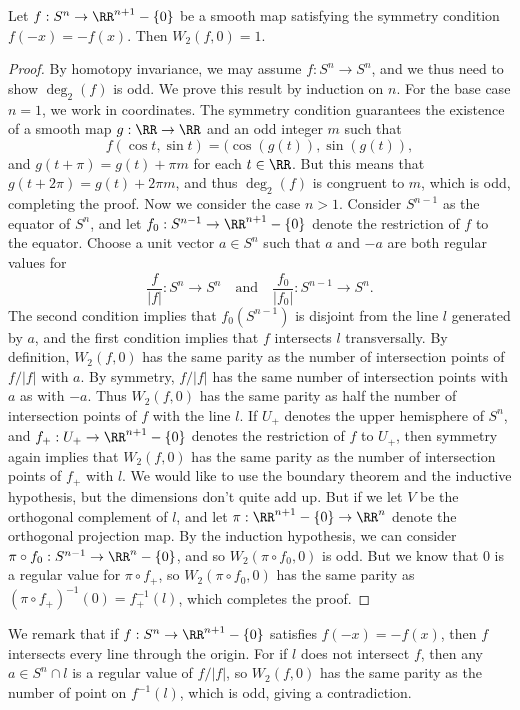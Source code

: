 \begin{theorem}
    Let $f: S^n \to \RR^{n+1} - \{ 0 \}$ be a smooth map satisfying the symmetry condition $f(-x) = -f(x)$. Then $W_2(f,0) = 1$.
\end{theorem}
\begin{proof}
    By homotopy invariance, we may assume $f: S^n \to S^n$, and we thus need to show $\deg_2(f)$ is odd. We prove this result by induction on $n$. For the base case $n = 1$, we work in coordinates. The symmetry condition guarantees the existence of a smooth map $g: \RR \to \RR$ and an odd integer $m$ such that
    \[ f(\cos t, \sin t) = (\cos(g(t)), \sin(g(t)), \]
    and $g(t + \pi) = g(t) + \pi m$ for each $t \in \RR$. But this means that $g(t + 2\pi) = g(t) + 2 \pi m$, and thus $\deg_2(f)$ is congruent to $m$, which is odd, completing the proof. Now we consider the case $n > 1$. Consider $S^{n-1}$ as the equator of $S^n$, and let $f_0: S^{n-1} \to \RR^{n+1} - \{ 0 \}$ denote the restriction of $f$ to the equator. Choose a unit vector $a \in S^n$ such that $a$ and $-a$ are both regular values for
    \[ \frac{f}{|f|}: S^n \to S^n \quad \text{and}\quad \frac{f_0}{|f_0|}: S^{n-1} \to S^n. \]
    The second condition implies that $f_0(S^{n-1})$ is disjoint from the line $l$ generated by $a$, and the first condition implies that $f$ intersects $l$ transversally. By definition, $W_2(f,0)$ has the same parity as the number of intersection points of $f/|f|$ with $a$. By symmetry, $f/|f|$ has the same number of intersection points with $a$ as with $-a$. Thus $W_2(f,0)$ has the same parity as half the number of intersection points of $f$ with the line $l$. If $U_+$ denotes the upper hemisphere of $S^n$, and $f_+: U_+ \to \RR^{n+1} - \{ 0 \}$ denotes the restriction of $f$ to $U_+$, then symmetry again implies that $W_2(f,0)$ has the same parity as the number of intersection points of $f_+$ with $l$. We would like to use the boundary theorem and the inductive hypothesis, but the dimensions don't quite add up. But if we let $V$ be the orthogonal complement of $l$, and let $\pi: \RR^{n+1} - \{ 0 \} \to \RR^n$ denote the orthogonal projection map. By the induction hypothesis, we can consider $\pi \circ f_0: S^{n-1} \to \RR^n - \{ 0 \}$, and so $W_2(\pi \circ f_0,0)$ is odd. But we know that $0$ is a regular value for $\pi \circ f_+$, so $W_2(\pi \circ f_0, 0)$ has the same parity as $(\pi \circ f_+)^{-1}(0) = f_+^{-1}(l)$, which completes the proof.
\end{proof}

\begin{remark}
    We remark that if $f: S^n \to \RR^{n+1} - \{ 0 \}$ satisfies $f(-x) = -f(x)$, then $f$ intersects every line through the origin. For if $l$ does not intersect $f$, then any $a \in S^n \cap l$ is a regular value of $f/|f|$, so $W_2(f,0)$ has the same parity as the number of point on $f^{-1}(l)$, which is odd, giving a contradiction.
\end{remark}

